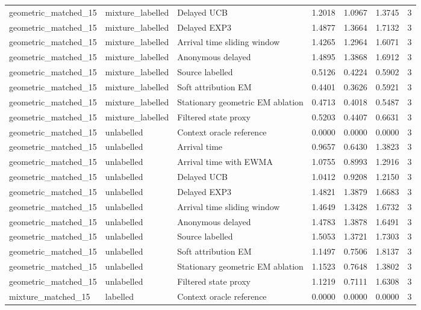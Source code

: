 \begin{tabular}{llllllr}
geometric\_matched\_15 & mixture\_labelled & Delayed UCB & 1.2018 & 1.0967 & 1.3745 & 3 \\
geometric\_matched\_15 & mixture\_labelled & Delayed EXP3 & 1.4877 & 1.3664 & 1.7132 & 3 \\
geometric\_matched\_15 & mixture\_labelled & Arrival time sliding window & 1.4265 & 1.2964 & 1.6071 & 3 \\
geometric\_matched\_15 & mixture\_labelled & Anonymous delayed & 1.4895 & 1.3868 & 1.6912 & 3 \\
geometric\_matched\_15 & mixture\_labelled & Source labelled & 0.5126 & 0.4224 & 0.5902 & 3 \\
geometric\_matched\_15 & mixture\_labelled & Soft attribution EM & 0.4401 & 0.3626 & 0.5921 & 3 \\
geometric\_matched\_15 & mixture\_labelled & Stationary geometric EM ablation & 0.4713 & 0.4018 & 0.5487 & 3 \\
geometric\_matched\_15 & mixture\_labelled & Filtered state proxy & 0.5203 & 0.4407 & 0.6631 & 3 \\
geometric\_matched\_15 & unlabelled & Context oracle reference & 0.0000 & 0.0000 & 0.0000 & 3 \\
geometric\_matched\_15 & unlabelled & Arrival time & 0.9657 & 0.6430 & 1.3823 & 3 \\
geometric\_matched\_15 & unlabelled & Arrival time with EWMA & 1.0755 & 0.8993 & 1.2916 & 3 \\
geometric\_matched\_15 & unlabelled & Delayed UCB & 1.0412 & 0.9208 & 1.2150 & 3 \\
geometric\_matched\_15 & unlabelled & Delayed EXP3 & 1.4821 & 1.3879 & 1.6683 & 3 \\
geometric\_matched\_15 & unlabelled & Arrival time sliding window & 1.4649 & 1.3428 & 1.6732 & 3 \\
geometric\_matched\_15 & unlabelled & Anonymous delayed & 1.4783 & 1.3878 & 1.6491 & 3 \\
geometric\_matched\_15 & unlabelled & Source labelled & 1.5053 & 1.3721 & 1.7303 & 3 \\
geometric\_matched\_15 & unlabelled & Soft attribution EM & 1.1497 & 0.7506 & 1.8137 & 3 \\
geometric\_matched\_15 & unlabelled & Stationary geometric EM ablation & 1.1523 & 0.7648 & 1.3802 & 3 \\
geometric\_matched\_15 & unlabelled & Filtered state proxy & 1.1219 & 0.7111 & 1.6308 & 3 \\
mixture\_matched\_15 & labelled & Context oracle reference & 0.0000 & 0.0000 & 0.0000 & 3 \\

\end{tabular}
